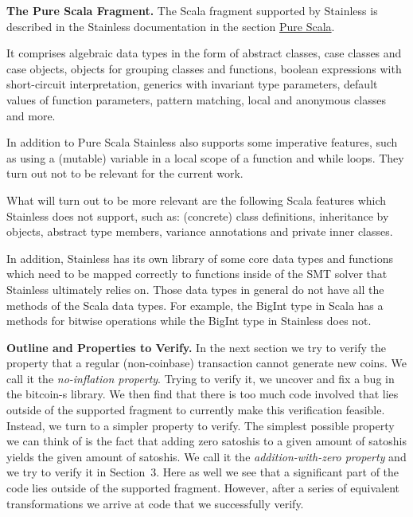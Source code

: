 \documentclass[runningheads]{llncs}
\renewcommand{\paragraph}{\textbf}%
\begin{document}
\paragraph{The Pure Scala Fragment.} The Scala fragment supported by
Stainless is described in the Stainless documentation
\cite{Stainless:documentation} in the section
\href{https://epfl-lara.github.io/stainless/purescala.html}{Pure
  Scala}.

It comprises algebraic data types in the form of abstract classes,
case classes and case objects, objects for grouping classes and
functions, boolean expressions with short-circuit interpretation,
generics with invariant type parameters, default values of function
parameters, pattern matching, local and anonymous classes and more.
  
In addition to Pure Scala Stainless also supports some imperative
features, such as using a (mutable) variable in a local scope of a
function and while loops. They turn out not to be relevant for the
current work.

What will turn out to be more relevant are the following Scala
features which Stainless does not support, such as: (concrete) class
definitions, inheritance by objects, abstract type members, variance
annotations and private inner classes.

In addition, Stainless has its own library of some core data types and
functions which need to be mapped correctly to functions inside of the
SMT solver that Stainless ultimately relies on. Those data types in
general do not have all the methods of the Scala data types. For
example, the BigInt type in Scala has a methods for bitwise operations
while the BigInt type in Stainless does not.

\paragraph{Outline and Properties to Verify.} In the next section we
try to verify the property that a regular (non-coinbase) transaction
cannot generate new coins. We call it the \emph{no-inflation
  property}. Trying to verify it, we uncover and fix a bug in the
bitcoin-s library. We then find that there is too much code involved
that lies outside of the supported fragment to currently make this
verification feasible. Instead, we turn to a simpler property to
verify. The simplest possible property we can think of is the fact
that adding zero satoshis to a given amount of satoshis yields the
given amount of satoshis. We call it the \emph{addition-with-zero
  property} and we try to verify it in Section~3. Here as well we see
that a significant part of the code lies outside of the supported
fragment. However, after a series of equivalent transformations we
arrive at code that we successfully verify.
\end{document}
